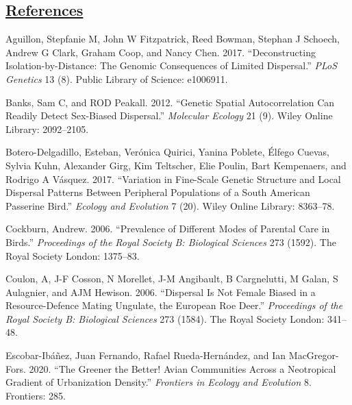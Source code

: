 \documentclass[]{article}
\begin{document}
\newpage

\hypertarget{references}{%
\subsection*{\texorpdfstring{\href{MyLibrary.bib}{References}}{References}}\label{references}}

\hypertarget{refs}{}
\leavevmode\hypertarget{ref-aguillon2017deconstructing}{}%
Aguillon, Stepfanie M, John W Fitzpatrick, Reed Bowman, Stephan J
Schoech, Andrew G Clark, Graham Coop, and Nancy Chen. 2017.
``Deconstructing Isolation-by-Distance: The Genomic Consequences of
Limited Dispersal.'' \emph{PLoS Genetics} 13 (8). Public Library of
Science: e1006911.

\leavevmode\hypertarget{ref-banks2012genetic}{}%
Banks, Sam C, and ROD Peakall. 2012. ``Genetic Spatial Autocorrelation
Can Readily Detect Sex-Biased Dispersal.'' \emph{Molecular Ecology} 21
(9). Wiley Online Library: 2092--2105.

\leavevmode\hypertarget{ref-botero2017variation}{}%
Botero-Delgadillo, Esteban, Verónica Quirici, Yanina Poblete, Élfego
Cuevas, Sylvia Kuhn, Alexander Girg, Kim Teltscher, Elie Poulin, Bart
Kempenaers, and Rodrigo A Vásquez. 2017. ``Variation in Fine-Scale
Genetic Structure and Local Dispersal Patterns Between Peripheral
Populations of a South American Passerine Bird.'' \emph{Ecology and
Evolution} 7 (20). Wiley Online Library: 8363--78.

\leavevmode\hypertarget{ref-cockburn2006prevalence}{}%
Cockburn, Andrew. 2006. ``Prevalence of Different Modes of Parental Care
in Birds.'' \emph{Proceedings of the Royal Society B: Biological
Sciences} 273 (1592). The Royal Society London: 1375--83.

\leavevmode\hypertarget{ref-coulon2006dispersal}{}%
Coulon, A, J-F Cosson, N Morellet, J-M Angibault, B Cargnelutti, M
Galan, S Aulagnier, and AJM Hewison. 2006. ``Dispersal Is Not Female
Biased in a Resource-Defence Mating Ungulate, the European Roe Deer.''
\emph{Proceedings of the Royal Society B: Biological Sciences} 273
(1584). The Royal Society London: 341--48.

\leavevmode\hypertarget{ref-escobar2020greener}{}%
Escobar-Ibáñez, Juan Fernando, Rafael Rueda-Hernández, and Ian
MacGregor-Fors. 2020. ``The Greener the Better! Avian Communities Across
a Neotropical Gradient of Urbanization Density.'' \emph{Frontiers in
Ecology and Evolution} 8. Frontiers: 285.
\end{document}
